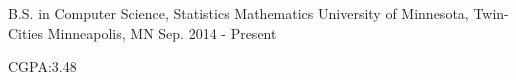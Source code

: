 

\begin{cventries}

  \cventry
    {B.S. in Computer Science, Statistics Mathematics} %
    {University of Minnesota, Twin-Cities} %
    {Minneapolis, MN} %
    {Sep. 2014 - Present} %
    {
      \begin{cvitems} %
         \item {CGPA:3.48}
      \end{cvitems}
    }

\end{cventries}
